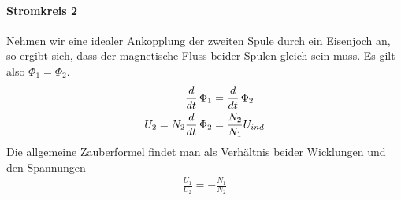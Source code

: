 \paragraph{Stromkreis 2}
Nehmen wir eine idealer Ankopplung der zweiten Spule durch ein Eisenjoch an, so ergibt sich, dass der magnetische Fluss beider Spulen gleich sein muss. Es gilt also $\Phi_1 = \Phi_2$. 
\begin{align} \label{eqn:Trafo_Strom2}
\frac{d }{dt} \,  \Phi_1 &= \frac{d }{dt} \,  \Phi_2\\
U_2 = N_2 \frac{d }{dt} \,  \Phi_2 &= \frac{N_2}{N_1} U_{ind}
\end{align}
Die allgemeine Zauberformel findet man als Verhältnis beider Wicklungen und den Spannungen
\begin{align} \label{eqn:Trafo_Formel}
\boxed{\frac{U_1}{U_2} = - \frac{N_1}{N_2}}
\end{align}
